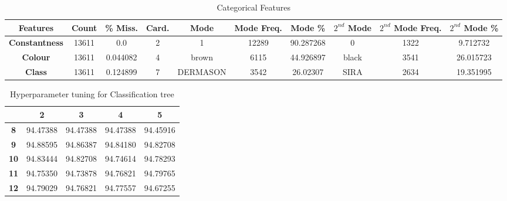\documentclass[10pt, conference]{IEEEtran}
\begin{document}
\begin{table}[h!]
    \caption{Categorical Features}
    \begin{center}
    \begin{tabular}{|c||c|c|c|c|c|c|c|c|c|}
        \hline
        \textbf{Features}&\textbf{Count}&\textbf{\% Miss.}&\textbf{Card.}&\textbf{Mode}&\textbf{Mode Freq.}&\textbf{Mode \%}&\textbf{$2^{nd}$ Mode}&\textbf{$2^{nd}$ Mode Freq.}&\textbf{$2^{nd}$ Mode \%}\\
        \hline
        \textbf{Constantness}       &13611  &0.0       &2       &1        &12289      &90.287268     &0          &1322         &9.712732\\
        \textbf{Colour}             &13611  &0.044082  &4       &brown    &6115       &44.926897    &black      &3541          &26.015723\\
        \textbf{Class}              &13611  &0.124899  &7       &DERMASON &3542       &26.02307     &SIRA       &2634          &19.351995\\

        \hline
    \end{tabular}
    \label{tab:categorical features}
    \end{center}
\end{table}

\begin{table}[h!]
    \caption{Hyperparameter tuning for Classification tree}
    \begin{center}
        \begin{tabular}{|c||c|c|c|c|}
                        & \textbf{2} & \textbf{3} & \textbf{4} & \textbf{5} \\
            \hline
            \textbf{8}  & 94.47388 & 94.47388 & 94.47388 & 94.45916\\
            \textbf{9}  & 94.88595 & 94.86387 & 94.84180 & 94.82708\\
            \textbf{10} & 94.83444 & 94.82708 & 94.74614 & 94.78293\\
            \textbf{11} & 94.75350 & 94.73878 & 94.76821 & 94.79765\\
            \textbf{12} & 94.79029 & 94.76821 & 94.77557 & 94.67255\\
        \end{tabular}
    \end{center}
\end{table}
\end{document}
